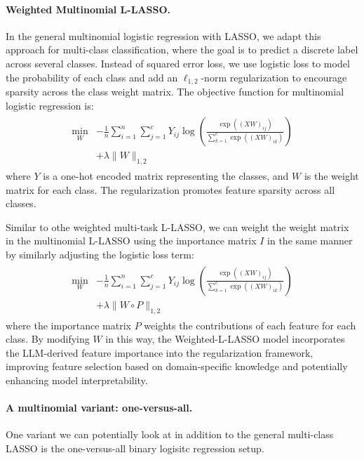 \paragraph{Weighted Multinomial L-LASSO.}
   In the general multinomial logistic regression with LASSO, we adapt this approach for multi-class classification, where the goal is to predict a discrete label across several classes. Instead of squared error loss, we use logistic loss to model the probability of each class and add an \( \ell_{1,2} \)-norm regularization to encourage sparsity across the class weight matrix. The objective function for multinomial logistic regression is:
     \begin{align}
     \begin{split}
     \min_{W} &-\frac{1}{n} \sum_{i=1}^n \sum_{j=1}^c Y_{ij} \log \left( \frac{\exp((X W)_{ij})}{\sum_{k=1}^c \exp((X W)_{ik})} \right) \\ &+ \lambda \| W \|_{1,2}
     \end{split}
     \end{align}
     where \( Y \) is a one-hot encoded matrix representing the classes, and \( W \) is the weight matrix for each class. The regularization promotes feature sparsity across all classes.

     Similar to othe weighted multi-task L-LASSO, we can weight the weight matrix in the multinomial L-LASSO using the importance matrix $I$ in the same manner by similarly adjusting the logistic loss term:
     \begin{align}
     \begin{split}
     \min_{W} &-\frac{1}{n} \sum_{i=1}^n \sum_{j=1}^c Y_{ij} \log \left( \frac{\exp((XW)_{ij})}{\sum_{k=1}^c \exp((XW)_{ik})} \right) \\ &+ \lambda \|W \circ P\|_{1,2}
     \end{split}
     \end{align}
     where the importance matrix \( P \) weights the contributions of each feature for each class. By modifying \( W \) in this way, the Weighted-L-LASSO model incorporates the LLM-derived feature importance into the regularization framework, improving feature selection based on domain-specific knowledge and potentially enhancing model interpretability.

     \paragraph{A multinomial variant: one-versus-all.} One variant we can potentially look at in addition to the general multi-class LASSO is the one-versus-all binary logisitc regression setup. 